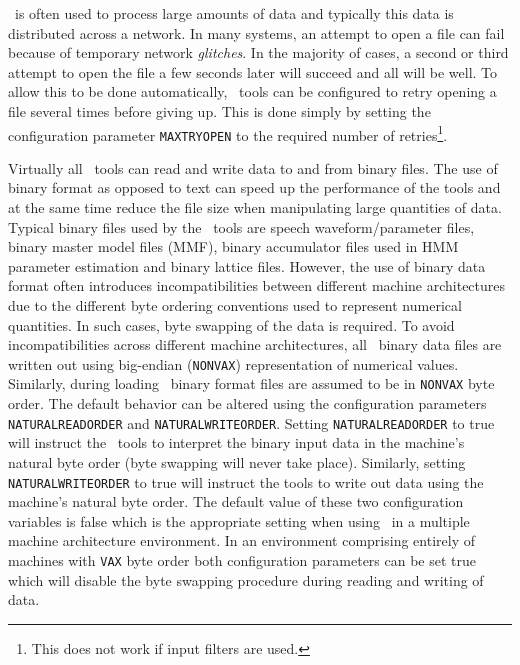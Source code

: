 \HTK\ is often used to process large amounts of data and typically this
data is distributed across a network.  In many systems, an attempt to open a
file can fail because of temporary network \textit{glitches}.  In the majority
of cases, a second or third attempt to open the file a few seconds later will
succeed and all will be well.  To allow this to be done automatically, 
\HTK\ tools can be configured to retry opening a file several times before giving up.
This is done simply by setting the configuration parameter
\texttt{MAXTRYOPEN} to the required
number of retries\footnote{ This does not work if input filters are used.  }.


Virtually all \HTK\ tools can read and write data to and from binary files. The
use of binary format as opposed to text can speed up the performance of the
tools and at the same time reduce the file size when manipulating large
quantities of data.  Typical binary files used by the \HTK\ tools are speech
waveform/parameter files, binary master model files (MMF), binary accumulator
files used in HMM parameter estimation and binary lattice files. However, the
use of binary data format often introduces incompatibilities between different
machine architectures due to the different byte ordering conventions used to
represent numerical quantities. In such cases, byte swapping of the data is
required. To avoid incompatibilities across different machine architectures,
all \HTK\ binary data files are written out using big-endian (\texttt{NONVAX})
representation of numerical values. Similarly, during loading \HTK\ binary
format files are assumed to be in \texttt{NONVAX} byte order. The default
behavior can be altered using the configuration parameters
\texttt{NATURALREADORDER} and
\texttt{NATURALWRITEORDER}. Setting \texttt{NATURALREADORDER} to true will
instruct the \HTK\ tools to interpret the binary input data in the machine's
natural byte order (byte swapping will never take place). Similarly, setting
\texttt{NATURALWRITEORDER} to true will instruct the tools to write out data
using the machine's natural byte order. The default value of these two
configuration variables is false which is the appropriate setting when using
\HTK\ in a multiple machine architecture environment. In an environment
comprising entirely of machines with \texttt{VAX} byte order both configuration
parameters can be set true which will disable the byte swapping procedure
during reading and writing of data.

